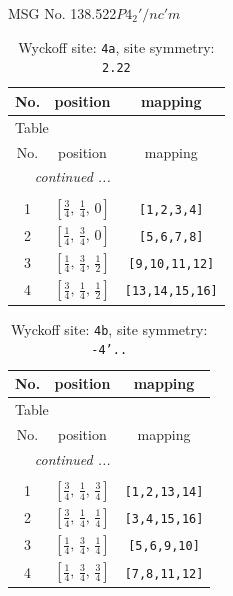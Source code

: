 \documentclass[fleqn,8pt]{jsarticle}
\begin{document}
\setcounter{MaxMatrixCols}{32}

\renewcommand{\tablename}{Table~}
\renewcommand{\figurename}{Figure~}
\begin{center}
\LARGE
MSG No. 138.522\quad$P4_{2}'/nc'm$
\end{center}
\renewcommand{\arraystretch}{1.2}
\begin{longtable}{ccc}
\caption{Wyckoff site: {\tt 4a}, site symmetry: {\tt 2.22}}
 \\
 \hline \hline
No. & position & mapping \\ \hline \endfirsthead

\multicolumn{2}{l}{\tablename\ \thetable{}} \\
 \hline \hline
No. & position & mapping \\ \hline \endhead

 \hline \hline
\multicolumn{2}{r}{\footnotesize\it continued ...} \\ \endfoot

 \hline \hline
\multicolumn{2}{r}{} \\ \endlastfoot

1 & $\left[ \frac{3}{4},\, \frac{1}{4},\, 0 \right]$ & {\tt [1,2,3,4]} \\ \hline
2 & $\left[ \frac{1}{4},\, \frac{3}{4},\, 0 \right]$ & {\tt [5,6,7,8]} \\ \hline
3 & $\left[ \frac{1}{4},\, \frac{3}{4},\, \frac{1}{2} \right]$ & {\tt [9,10,11,12]} \\ \hline
4 & $\left[ \frac{3}{4},\, \frac{1}{4},\, \frac{1}{2} \right]$ & {\tt [13,14,15,16]} \\
\end{longtable}
\renewcommand{\arraystretch}{1.2}
\begin{longtable}{ccc}
\caption{Wyckoff site: {\tt 4b}, site symmetry: {\tt -4'..}}
 \\
 \hline \hline
No. & position & mapping \\ \hline \endfirsthead

\multicolumn{2}{l}{\tablename\ \thetable{}} \\
 \hline \hline
No. & position & mapping \\ \hline \endhead

 \hline \hline
\multicolumn{2}{r}{\footnotesize\it continued ...} \\ \endfoot

 \hline \hline
\multicolumn{2}{r}{} \\ \endlastfoot

1 & $\left[ \frac{3}{4},\, \frac{1}{4},\, \frac{3}{4} \right]$ & {\tt [1,2,13,14]} \\ \hline
2 & $\left[ \frac{3}{4},\, \frac{1}{4},\, \frac{1}{4} \right]$ & {\tt [3,4,15,16]} \\ \hline
3 & $\left[ \frac{1}{4},\, \frac{3}{4},\, \frac{1}{4} \right]$ & {\tt [5,6,9,10]} \\ \hline
4 & $\left[ \frac{1}{4},\, \frac{3}{4},\, \frac{3}{4} \right]$ & {\tt [7,8,11,12]} \\
\end{longtable}
\end{document}

